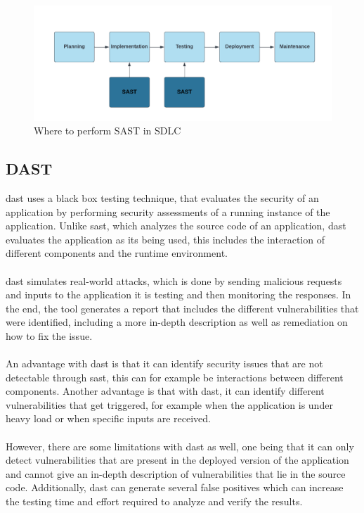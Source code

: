 \vspace{2mm}
\begin{figure}[H]
    \centering
    \includegraphics[width=0.8\columnwidth]{Images/sast.png}
    \caption{Where to perform SAST in SDLC}
    \label{fig: Performance of SAST in SDLC}
\end{figure}


\subsection{DAST}
\acrlong{dast} uses a black box testing technique, that evaluates the security of an application by performing security assessments of a running instance of the application. Unlike \acrshort{sast}, which analyzes the source code of an application, \acrshort{dast} evaluates the application as its being used, this includes the interaction of different components and the runtime environment. 
\\~\\
\acrshort{dast} simulates real-world attacks, which is done by sending malicious requests and inputs to the application it is testing and then monitoring the responses. In the end, the tool generates a report that includes the different vulnerabilities that were identified, including a more in-depth description as well as remediation on how to fix the issue. 
\\~\\
An advantage with \acrshort{dast} is that it can identify security issues that are not detectable through \acrshort{sast}, this can for example be interactions between different components. Another advantage is that with \acrshort{dast}, it can identify different vulnerabilities that get triggered, for example when the application is under heavy load or when specific inputs are received.
\\~\\
However, there are some limitations with \acrshort{dast} as well, one being that it can only detect vulnerabilities that are present in the deployed version of the application and cannot give an in-depth description of vulnerabilities that lie in the source code. Additionally, \acrshort{dast} can generate several false positives which can increase the testing time and effort required to analyze and verify the results. 
